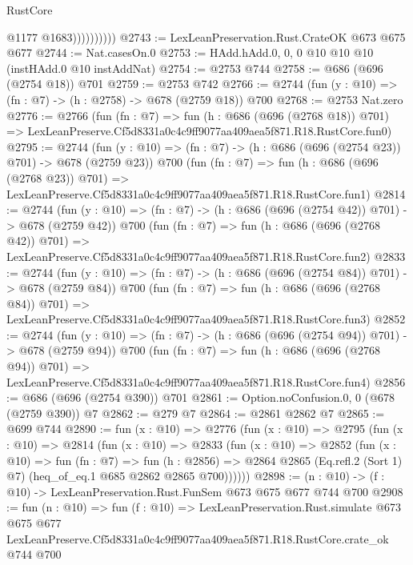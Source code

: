\begin{lexlean}{RustCore}
\begin{coremodule}
                        @1177
                        @1683))))))))))
@2743 := LexLeanPreservation.Rust.CrateOK @673 @675 @677
@2744 := Nat.casesOn.{0}
@2753 := HAdd.hAdd.{0, 0, 0} @10 @10 @10 (instHAdd.{0} @10 instAddNat)
@2754 := @2753 @744
@2758 := @686 (@696 (@2754 @18)) @701
@2759 := @2753 @742
@2766 := @2744 (fun (y : @10) => (fn : @7) -> (h : @2758) -> @678 (@2759 @18)) @700
@2768 := @2753 Nat.zero
@2776 := @2766
    (fun (fn : @7) =>
    fun (h : @686 (@696 (@2768 @18)) @701) =>
    LexLeanPreserve.Cf5d8331a0c4c9ff9077aa409aea5f871.R18.RustCore.fun0)
@2795 := @2744
    (fun (y : @10) => (fn : @7) -> (h : @686 (@696 (@2754 @23)) @701) -> @678 (@2759 @23))
    @700
    (fun (fn : @7) =>
    fun (h : @686 (@696 (@2768 @23)) @701) =>
    LexLeanPreserve.Cf5d8331a0c4c9ff9077aa409aea5f871.R18.RustCore.fun1)
@2814 := @2744
    (fun (y : @10) => (fn : @7) -> (h : @686 (@696 (@2754 @42)) @701) -> @678 (@2759 @42))
    @700
    (fun (fn : @7) =>
    fun (h : @686 (@696 (@2768 @42)) @701) =>
    LexLeanPreserve.Cf5d8331a0c4c9ff9077aa409aea5f871.R18.RustCore.fun2)
@2833 := @2744
    (fun (y : @10) => (fn : @7) -> (h : @686 (@696 (@2754 @84)) @701) -> @678 (@2759 @84))
    @700
    (fun (fn : @7) =>
    fun (h : @686 (@696 (@2768 @84)) @701) =>
    LexLeanPreserve.Cf5d8331a0c4c9ff9077aa409aea5f871.R18.RustCore.fun3)
@2852 := @2744
    (fun (y : @10) => (fn : @7) -> (h : @686 (@696 (@2754 @94)) @701) -> @678 (@2759 @94))
    @700
    (fun (fn : @7) =>
    fun (h : @686 (@696 (@2768 @94)) @701) =>
    LexLeanPreserve.Cf5d8331a0c4c9ff9077aa409aea5f871.R18.RustCore.fun4)
@2856 := @686 (@696 (@2754 @390)) @701
@2861 := Option.noConfusion.{0, 0} (@678 (@2759 @390)) @7
@2862 := @279 @7
@2864 := @2861 @2862 @7
@2865 := @699 @744
@2890 := fun (x : @10) =>
  @2776
    (fun (x : @10) =>
    @2795
      (fun (x : @10) =>
      @2814
        (fun (x : @10) =>
        @2833
          (fun (x : @10) =>
          @2852
            (fun (x : @10) =>
            fun (fn : @7) =>
            fun (h : @2856) =>
            @2864 @2865 (Eq.refl.{2} (Sort 1) @7) (heq_of_eq.{1} @685 @2862 @2865 @700))))))
@2898 := (n : @10) -> (f : @10) -> LexLeanPreservation.Rust.FunSem @673 @675 @677 @744 @700
@2908 := fun (n : @10) =>
  fun (f : @10) =>
  LexLeanPreservation.Rust.simulate
    @673
    @675
    @677
    LexLeanPreserve.Cf5d8331a0c4c9ff9077aa409aea5f871.R18.RustCore.crate_ok
    @744
    @700
\end{coremodule}
\end{lexlean}
